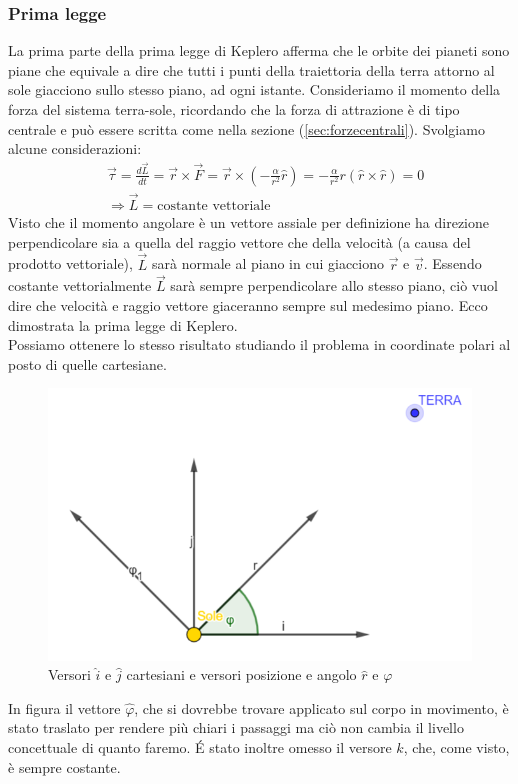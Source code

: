 \subsubsection{Prima legge}
La prima parte della prima legge di Keplero afferma che le orbite dei pianeti sono piane che equivale a dire che tutti i punti della traiettoria della terra attorno al sole giacciono sullo stesso piano, ad ogni istante. Consideriamo il momento della forza del sistema terra-sole, ricordando che la forza di attrazione è di tipo centrale e può essere scritta come nella sezione (\ref{sec:forzecentrali}). Svolgiamo alcune considerazioni:
\begin{align*}
&\vec{\tau} = \frac{d\vec{L}}{dt} = \vec{r}\times \vec{F} = \vec{r}\times (-\frac{\alpha}{r^2}\hat{r}) = -\frac{\alpha}{r^2}r( \hat{r}\times \hat{r}) = 0\\
&\Rightarrow \vec{L} = \text{costante vettoriale}
\end{align*}
Visto che il momento angolare è un vettore assiale per definizione ha direzione perpendicolare sia a quella del raggio vettore che della velocità (a causa del prodotto vettoriale), $\vec{L}$ sarà normale al piano in cui giacciono $\vec{r}$ e $\vec{v}$. Essendo costante vettorialmente $\vec{L}$ sarà sempre perpendicolare allo stesso piano, ciò vuol dire che velocità e raggio vettore giaceranno sempre sul medesimo piano. Ecco dimostrata la prima legge di Keplero.\\
Possiamo ottenere lo stesso risultato studiando il problema in coordinate polari al posto di quelle cartesiane. \\
\begin{figure}[h!]
	\centering
	\includegraphics[width=0.4\linewidth]{../images/polarcoordinates}
	\caption{Versori $\hat{i}$ e $\hat{j}$ cartesiani e versori posizione e angolo $\hat{r}$ e $\varphi$}
	\label{fig:polarcoordinates}
\end{figure}\FloatBarrier
In figura il vettore $\hat{\varphi}$, che si dovrebbe trovare applicato sul corpo in movimento, è stato traslato per rendere più chiari i passaggi ma ciò non cambia il livello concettuale di quanto faremo. \'{E} stato inoltre omesso il versore $\hat{k}$, che, come visto, è sempre costante.\\
